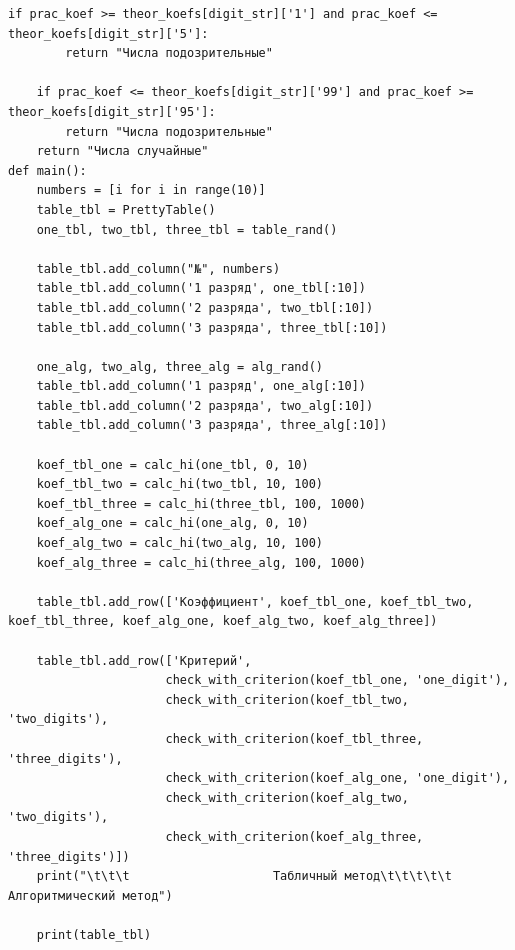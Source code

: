 \documentclass[14pt, a4paper]{extarticle}
\begin{document}
\begin{lstlisting}[label=lst:list1]
    if prac_koef >= theor_koefs[digit_str]['1'] and prac_koef <= theor_koefs[digit_str]['5']:
        return "Числа подозрительные"

    if prac_koef <= theor_koefs[digit_str]['99'] and prac_koef >= theor_koefs[digit_str]['95']:
        return "Числа подозрительные"
    return "Числа случайные"
def main():
    numbers = [i for i in range(10)]
    table_tbl = PrettyTable()
    one_tbl, two_tbl, three_tbl = table_rand()

    table_tbl.add_column("№", numbers)
    table_tbl.add_column('1 разряд', one_tbl[:10])
    table_tbl.add_column('2 разряда', two_tbl[:10])
    table_tbl.add_column('3 разряда', three_tbl[:10])

    one_alg, two_alg, three_alg = alg_rand()
    table_tbl.add_column('1 разряд', one_alg[:10])
    table_tbl.add_column('2 разряда', two_alg[:10])
    table_tbl.add_column('3 разряда', three_alg[:10])

    koef_tbl_one = calc_hi(one_tbl, 0, 10)
    koef_tbl_two = calc_hi(two_tbl, 10, 100)
    koef_tbl_three = calc_hi(three_tbl, 100, 1000)
    koef_alg_one = calc_hi(one_alg, 0, 10)
    koef_alg_two = calc_hi(two_alg, 10, 100)
    koef_alg_three = calc_hi(three_alg, 100, 1000)

    table_tbl.add_row(['Коэффициент', koef_tbl_one, koef_tbl_two, koef_tbl_three, koef_alg_one, koef_alg_two, koef_alg_three])

    table_tbl.add_row(['Критерий',
                      check_with_criterion(koef_tbl_one, 'one_digit'),
                      check_with_criterion(koef_tbl_two, 'two_digits'),
                      check_with_criterion(koef_tbl_three, 'three_digits'),
                      check_with_criterion(koef_alg_one, 'one_digit'),
                      check_with_criterion(koef_alg_two, 'two_digits'),
                      check_with_criterion(koef_alg_three, 'three_digits')])
    print("\t\t\t                    Табличный метод\t\t\t\t\t                                    Алгоритмический метод")

    print(table_tbl)


\end{lstlisting}
\end{document}
